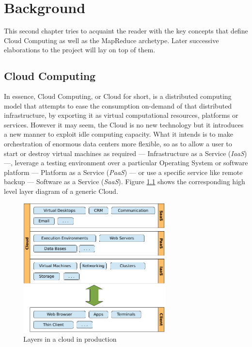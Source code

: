 \chapter{Background}\label{cap:estadodelarte}

\noindent This second chapter tries to acquaint the reader with the key concepts that define Cloud Computing as well as the MapReduce archetype. Later successive elaborations to the project will lay on top of them.

\section{Cloud Computing}\label{sec:computacioncloud}

\noindent In essence, Cloud Computing, or Cloud for short, is a distributed computing model that attempts to ease the consumption on-demand of that distributed infrastructure, by exporting it as virtual computational resources, platforms or services. However it may seem, the Cloud is no new technology but it introduces a new manner to exploit idle computing capacity. What it intends is to make orchestration of enormous data centers more flexible, so as to allow a user to start or destroy virtual machines as required --- Infrastructure as a Service (\emph{IaaS}) ---, leverage a testing environment over a particular Operating System or software platform --- Platform as a Service (\emph{PaaS}) --- or use a specific service like remote backup --- Software as a Service (\emph{SaaS}). Figure \ref{fig:cloudlayers} shows the corresponding high level layer diagram of a generic Cloud.

\begin{figure}[tbp]
\begin{center}
\includegraphics[width=0.69\textwidth]{imagenes/003.pdf}
 \caption{Layers in a cloud in production}
\label{fig:cloudlayers}
\end{center}
\end{figure}

